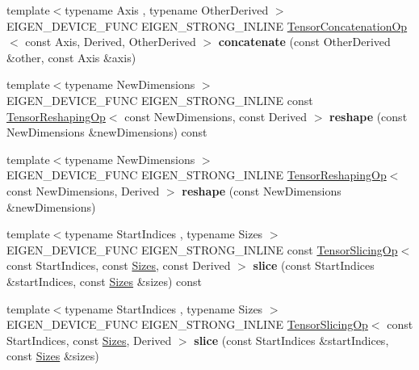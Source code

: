 \begin{DoxyCompactItemize}
{\footnotesize template$<$typename Axis , typename Other\+Derived $>$ }\\E\+I\+G\+E\+N\+\_\+\+D\+E\+V\+I\+C\+E\+\_\+\+F\+U\+NC E\+I\+G\+E\+N\+\_\+\+S\+T\+R\+O\+N\+G\+\_\+\+I\+N\+L\+I\+NE \hyperlink{class_eigen_1_1_tensor_concatenation_op}{Tensor\+Concatenation\+Op}$<$ const Axis, Derived, Other\+Derived $>$ {\bfseries concatenate} (const Other\+Derived \&other, const Axis \&axis)
\item 
\mbox{\label{class_eigen_1_1_tensor_base_a375aa0fca9f21dbc5fccb2227172e950}} 
{\footnotesize template$<$typename New\+Dimensions $>$ }\\E\+I\+G\+E\+N\+\_\+\+D\+E\+V\+I\+C\+E\+\_\+\+F\+U\+NC E\+I\+G\+E\+N\+\_\+\+S\+T\+R\+O\+N\+G\+\_\+\+I\+N\+L\+I\+NE const \hyperlink{class_eigen_1_1_tensor_reshaping_op}{Tensor\+Reshaping\+Op}$<$ const New\+Dimensions, const Derived $>$ {\bfseries reshape} (const New\+Dimensions \&new\+Dimensions) const
\item 
\mbox{\label{class_eigen_1_1_tensor_base_afc966748350735d918a45bf13c214d25}} 
{\footnotesize template$<$typename New\+Dimensions $>$ }\\E\+I\+G\+E\+N\+\_\+\+D\+E\+V\+I\+C\+E\+\_\+\+F\+U\+NC E\+I\+G\+E\+N\+\_\+\+S\+T\+R\+O\+N\+G\+\_\+\+I\+N\+L\+I\+NE \hyperlink{class_eigen_1_1_tensor_reshaping_op}{Tensor\+Reshaping\+Op}$<$ const New\+Dimensions, Derived $>$ {\bfseries reshape} (const New\+Dimensions \&new\+Dimensions)
\item 
\mbox{\label{class_eigen_1_1_tensor_base_a834af784d043394a9c65e6688c0a40b8}} 
{\footnotesize template$<$typename Start\+Indices , typename Sizes $>$ }\\E\+I\+G\+E\+N\+\_\+\+D\+E\+V\+I\+C\+E\+\_\+\+F\+U\+NC E\+I\+G\+E\+N\+\_\+\+S\+T\+R\+O\+N\+G\+\_\+\+I\+N\+L\+I\+NE const \hyperlink{class_eigen_1_1_tensor_slicing_op}{Tensor\+Slicing\+Op}$<$ const Start\+Indices, const \hyperlink{struct_eigen_1_1_sizes}{Sizes}, const Derived $>$ {\bfseries slice} (const Start\+Indices \&start\+Indices, const \hyperlink{struct_eigen_1_1_sizes}{Sizes} \&sizes) const
\item 
\mbox{\label{class_eigen_1_1_tensor_base_a958a115d2ea37b6530b27122db3c2f8b}} 
{\footnotesize template$<$typename Start\+Indices , typename Sizes $>$ }\\E\+I\+G\+E\+N\+\_\+\+D\+E\+V\+I\+C\+E\+\_\+\+F\+U\+NC E\+I\+G\+E\+N\+\_\+\+S\+T\+R\+O\+N\+G\+\_\+\+I\+N\+L\+I\+NE \hyperlink{class_eigen_1_1_tensor_slicing_op}{Tensor\+Slicing\+Op}$<$ const Start\+Indices, const \hyperlink{struct_eigen_1_1_sizes}{Sizes}, Derived $>$ {\bfseries slice} (const Start\+Indices \&start\+Indices, const \hyperlink{struct_eigen_1_1_sizes}{Sizes} \&sizes)

\end{DoxyCompactItemize}
